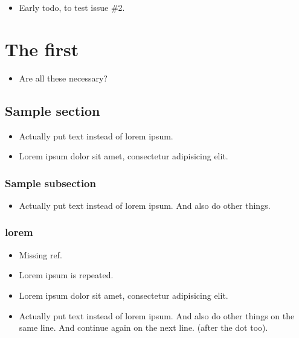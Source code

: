     \begin{itemize}[noitemsep]
        \item {\color{red}Early todo, to test issue \#2.}
    \end{itemize}
\chapter{The first}
\label{autosec:0}
    \begin{itemize}[noitemsep]
        \item {\color{ForestGreen}Are all these necessary?}
    \end{itemize}
\section{Sample section}
\label{autosec:1}
    \begin{itemize}[noitemsep]
        \item {\color{red}Actually put text instead of lorem ipsum.}
        \item Lorem ipsum dolor sit amet, consectetur adipisicing elit.
    \end{itemize}
\subsection{Sample subsection}
\label{autosec:2}
    \begin{itemize}[noitemsep]
        \item {\color{red}Actually put text instead of lorem ipsum.}
{\color{red}And also do other things.}
    \end{itemize}
\subsection{lorem}
\label{autosec:3}
    \begin{itemize}[noitemsep]
        \item {\color{Periwinkle}Missing ref.}
        \item {\color{DarkOrchid}Lorem ipsum is repeated.}
        \item Lorem ipsum dolor sit amet, consectetur adipisicing elit.
        \item {\color{red}Actually put text instead of lorem ipsum. And also do other things on the same line.}
{\color{red}And continue again on the next line. (after the dot too).}
    \end{itemize}
